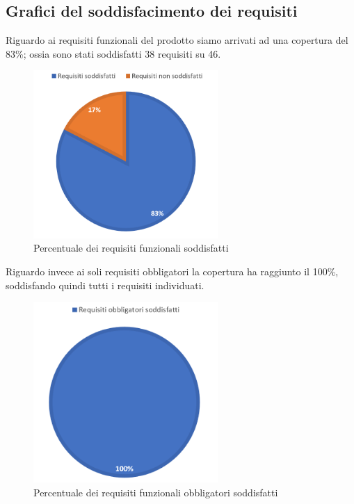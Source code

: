 \subsection{Grafici del soddisfacimento dei requisiti}
Riguardo ai requisiti funzionali del prodotto siamo arrivati ad una copertura del 83\%; ossia sono stati soddisfatti 38 requisiti su 46.
\begin{figure}[hb]
\includegraphics[width=7cm]{Images/RequisitiTotali}
\centering
\caption{Percentuale dei requisiti funzionali soddisfatti}
\end{figure}

Riguardo invece ai soli requisiti obbligatori la copertura ha raggiunto il 100\%, soddisfando quindi tutti i requisiti individuati.
\begin{figure}[hb]
\includegraphics[width=7cm]{Images/RequisitiObbligatori}
\centering
\caption{Percentuale dei requisiti funzionali obbligatori soddisfatti}
\end{figure}